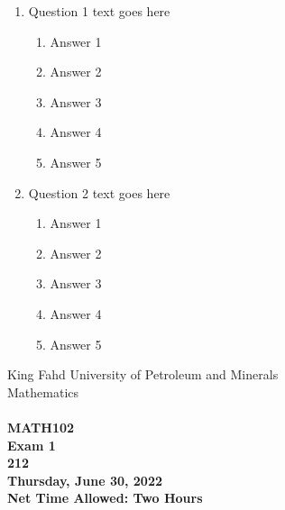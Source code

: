 \documentclass[amsfonts,bezier,leqno,fleqn,12pt,a4paper]{article}
\begin{document}
\newpage


\renewcommand{\thepage}{\noindent Term 212, MATH102, Exam 1 \hfill Page {\bf \arabic{page} of 1 } \hfill {\bf \fbox{ MASTER }}}
\setcounter{page}{1}


\begin{large}
\begin{enumerate}

\item Question 1 text goes here
\vspace {0.3in}
\setcounter{equation}{0}

\begin{enumerate}
\item Answer 1
\item Answer 2
\item Answer 3
\item Answer 4
\item Answer 5

\end{enumerate}

\vspace {3.5cm}


\item Question 2 text goes here
\vspace {0.3in}
\setcounter{equation}{0}

\begin{enumerate}
\item Answer 1
\item Answer 2
\item Answer 3
\item Answer 4
\item Answer 5

\end{enumerate}
\newpage


\end{enumerate}
\end{large}



\newpage


\thispagestyle{empty}
\begin{center}
    \begin{large}
        King Fahd University of Petroleum and Minerals \\ 
        Mathematics  \\ 
        \vspace*{4.5cm}
        {\bf {} }  \hfill {\bf {}} \\
        {\bf MATH102 }  \\
        {\bf Exam 1 }  \\
        {\bf 212 }  \\
        {\bf Thursday, June 30, 2022 }  \\ 
        {\bf Net Time Allowed: Two Hours }  \\
        \vspace*{0.2cm}

    \end{large}
\end{center}
\end{document}
